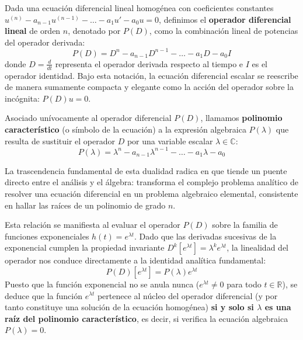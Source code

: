 \begin{definición}
    Dada una ecuación diferencial lineal homogénea con coeficientes constantes $u^{(n)} - a_{n-1} u^{(n-1)} - \dots - a_1 u' - a_0 u = 0$, definimos el \textbf{operador diferencial lineal} de orden $n$, denotado por $P(D)$, como la combinación lineal de potencias del operador derivada:
    \[
        P(D) = D^n - a_{n-1} D^{n-1} - \dots - a_1 D - a_0 I
    \]
    donde $D = \frac{d}{dt}$ representa el operador derivada respecto al tiempo e $I$ es el operador identidad. Bajo esta notación, la ecuación diferencial escalar se reescribe de manera sumamente compacta y elegante como la acción del operador sobre la incógnita: $P(D)u = 0$.
\end{definición}

\begin{definición}
    Asociado unívocamente al operador diferencial $P(D)$, llamamos \textbf{polinomio característico} (o símbolo de la ecuación) a la expresión algebraica $P(\lambda)$ que resulta de sustituir el operador $D$ por una variable escalar $\lambda \in \mathbb{C}$:
    \[ 
        P(\lambda) = \lambda^n - a_{n-1} \lambda^{n-1} - \dots - a_1 \lambda - a_0 
    \]
\end{definición}

La trascendencia fundamental de esta dualidad radica en que tiende un puente directo entre el análisis y el álgebra: transforma el complejo problema analítico de resolver una ecuación diferencial en un problema algebraico elemental, consistente en hallar las raíces de un polinomio de grado $n$.

Esta relación se manifiesta al evaluar el operador $P(D)$ sobre la familia de funciones exponenciales $h(t) = e^{\lambda t}$. Dado que las derivadas sucesivas de la exponencial cumplen la propiedad invariante $D^k [e^{\lambda t}] = \lambda^k e^{\lambda t}$, la linealidad del operador nos conduce directamente a la identidad analítica fundamental:
\[
    P(D) [e^{\lambda t}] = P(\lambda) e^{\lambda t}
\]
Puesto que la función exponencial no se anula nunca ($e^{\lambda t} \neq 0$ para todo $t \in \mathbb{R}$), se deduce que la función $e^{\lambda t}$ pertenece al núcleo del operador diferencial (y por tanto constituye una solución de la ecuación homogénea) \textbf{si y solo si $\lambda$ es una raíz del polinomio característico}, es decir, si verifica la ecuación algebraica $P(\lambda) = 0$.

